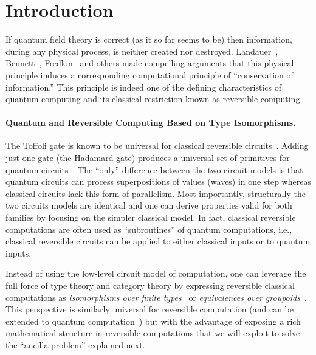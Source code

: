 \documentclass[sigplan,10pt,review,anonymous]{acmart}
\begin{document}






\section{Introduction}

If quantum field theory is correct (as it so far seems to be) then
information, during any physical process, is neither created nor
destroyed. Landauer~\cite{Landauer:1961,Landauer,bennett1985fundamental},
Bennett~\cite{bennett2010notes,bennett2003notes,Bennett:1973:LRC},
Fredkin~\cite{fredkin1982conservative} and others made compelling
arguments that this physical principle induces a corresponding
computational principle of ``conservation of information.'' This
principle is indeed one of the defining characteristics of quantum
computing and its classical restriction known as reversible computing.

\paragraph*{Quantum and Reversible Computing Based on Type
  Isomorphisms.} The Toffoli gate is known to be universal for
classical reversible circuits~\cite{Toffoli:1980}. Adding just one
gate (the Hadamard gate) produces a universal set of primitives for
quantum circuits~\cite{hadtoffuniv}. The ``only'' difference between
the two circuit models is that quantum circuits can process
superpositions of values (waves) in one step whereas classical
circuits lack this form of parallelism. Most importantly, structurally
the two circuits models are identical and one can derive properties
valid for both families by focusing on the simpler classical model. In
fact, classical reversible computations are often used as
``subroutines'' of quantum computations, i.e., classical reversible
circuits can be applied to either classical inputs or to quantum
inputs.

Instead of using the low-level circuit model of computation,
one can leverage the full force of type theory and category theory by
expressing reversible classical computations as \emph{isomorphisms
  over finite types}~\cite{Fiore:2004,James:2012:IE:2103656.2103667}
or \emph{equivalences over
  groupoids}~\cite{DBLP:conf/esop/CaretteS16}. This perspective is
similarly universal for reversible computation (and can be extended to
quantum computation~\cite{10.1007/978-3-319-89366-2_19}) but with the
advantage of exposing a rich mathematical structure in reversible
computations that we will exploit to solve the ``ancilla problem''
explained next.
\end{document}
